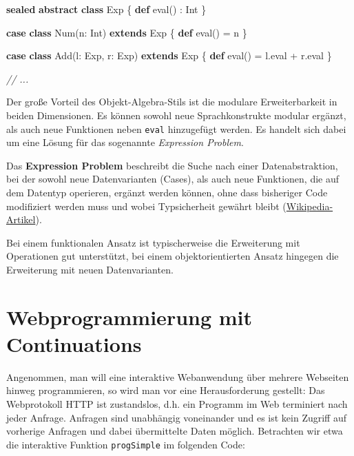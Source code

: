 \documentclass[]{article}
\newenvironment{Shaded}{}{}
\newcommand{\CommentTok}[1]{\textcolor[rgb]{0.38,0.63,0.69}{\textit{#1}}}
\newcommand{\FunctionTok}[1]{\textcolor[rgb]{0.02,0.16,0.49}{#1}}
\newcommand{\KeywordTok}[1]{\textcolor[rgb]{0.00,0.44,0.13}{\textbf{#1}}}
\newcommand{\NormalTok}[1]{#1}
\begin{document}
\begin{Shaded}
\begin{Highlighting}[]
\KeywordTok{sealed} \KeywordTok{abstract} \KeywordTok{class}\NormalTok{ Exp \{}
  \KeywordTok{def} \FunctionTok{eval}\NormalTok{() : Int}
\NormalTok{\}}

\KeywordTok{case} \KeywordTok{class} \FunctionTok{Num}\NormalTok{(n: Int) }\KeywordTok{extends}\NormalTok{ Exp \{}
  \KeywordTok{def} \FunctionTok{eval}\NormalTok{() = n}
\NormalTok{\}}

\KeywordTok{case} \KeywordTok{class} \FunctionTok{Add}\NormalTok{(l: Exp, r: Exp) }\KeywordTok{extends}\NormalTok{ Exp \{}
  \KeywordTok{def} \FunctionTok{eval}\NormalTok{() = l.}\FunctionTok{eval}\NormalTok{ + r.}\FunctionTok{eval}
\NormalTok{\}}

\CommentTok{// ...}
\end{Highlighting}
\end{Shaded}

Der große Vorteil des Objekt-Algebra-Stils ist die modulare
Erweiterbarkeit in beiden Dimensionen. Es können sowohl neue
Sprachkonstrukte modular ergänzt, als auch neue Funktionen neben
\texttt{eval} hinzugefügt werden. Es handelt sich dabei um eine Lösung
für das sogenannte \emph{Expression Problem}.

Das \textbf{Expression Problem} beschreibt die Suche nach einer
Datenabstraktion, bei der sowohl neue Datenvarianten (Cases), als auch
neue Funktionen, die auf dem Datentyp operieren, ergänzt werden können,
ohne dass bisheriger Code modifiziert werden muss und wobei
Typsicherheit gewährt bleibt
(\href{https://en.wikipedia.org/wiki/Expression_problem}{Wikipedia-Artikel}).

Bei einem funktionalen Ansatz ist typischerweise die Erweiterung mit
Operationen gut unterstützt, bei einem objektorientierten Ansatz
hingegen die Erweiterung mit neuen Datenvarianten.

\hypertarget{webprogrammierung-mit-continuations}{%
\section{Webprogrammierung mit
Continuations}\label{webprogrammierung-mit-continuations}}

Angenommen, man will eine interaktive Webanwendung über mehrere
Webseiten hinweg programmieren, so wird man vor eine Herausforderung
gestellt: Das Webprotokoll HTTP ist zustandslos, d.h. ein Programm im
Web terminiert nach jeder Anfrage. Anfragen sind unabhängig voneinander
und es ist kein Zugriff auf vorherige Anfragen und dabei übermittelte
Daten möglich. Betrachten wir etwa die interaktive Funktion
\texttt{progSimple} im folgenden Code:
\end{document}
